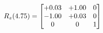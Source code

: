 \documentclass[preview]{standalone}
\begin{document}
\begin{align*}
\special{dvisvgm:raw <g id='unique000'>}R_{z}(4.75) = \begin{bmatrix}+0.03 & +1.00 & 0 \\-1.00 & +0.03 & 0 \\0 & 0 & 1\end{bmatrix}\special{dvisvgm:raw </g>}
\end{align*}
\end{document}
